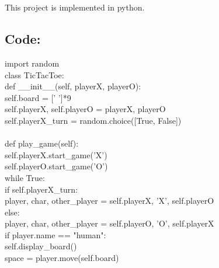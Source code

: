 \documentclass[a4paper, 12pt, notitlepage]{report}
\begin{document}
\appendix
\chapter{}
%
This project is implemented in python.

\section*{Code:}
%
import random\\
class TicTacToe:\\
    \hspace*{4ex} def \_\_init\_\_(self, playerX, playerO):\\
    \hspace*{8ex} 	self.board = [' ']*9 \\
    \hspace*{8ex} 	self.playerX, self.playerO = playerX, playerO \\
    \hspace*{8ex} 	self.playerX\_turn = random.choice([True, False])\\
\\
    \hspace*{4ex} def play\_game(self):\\
    \hspace*{8ex} 	self.playerX.start\_game('X')\\
    \hspace*{8ex} 	self.playerO.start\_game('O')\\
    \hspace*{8ex} while True:\\ 
    \hspace*{12ex} 	if self.playerX\_turn:\\
    \hspace*{16ex} 		player, char, other\_player = self.playerX, 'X', self.playerO\\
    \hspace*{12ex} else:\\
    \hspace*{16ex} 		player, char, other\_player = self.playerO, 'O', self.playerX\\
    \hspace*{12ex} if player.name == "human":\\
    \hspace*{16ex} 		self.display\_board()\\
    \hspace*{12ex} space = player.move(self.board)\\
\end{document}
